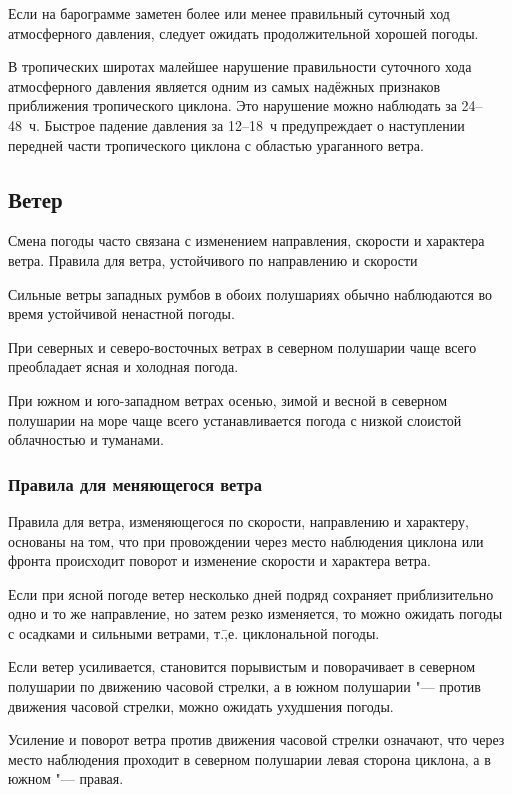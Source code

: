  Если на барограмме заметен более или менее правильный суточный
ход атмосферного давления, следует ожидать продолжительной хорошей
погоды.

 В тропических широтах малейшее нарушение правильности
суточного хода атмосферного давления является одним из самых надёжных
признаков приближения тропического циклона. Это нарушение можно
наблюдать за 24--48~ч. Быстрое падение давления за 12--18~ч
предупреждает о наступлении передней части тропического циклона с
областью ураганного ветра.

\subsection{Ветер}

Смена погоды часто связана с изменением направления, скорости и
характера ветра.  Правила для ветра, устойчивого по направлению и
скорости

 Сильные ветры западных румбов в обоих полушариях обычно
наблюдаются во время устойчивой ненастной погоды.

 При северных и северо-восточных ветрах в северном полушарии
чаще всего преобладает ясная и холодная погода.

 При южном и юго-западном ветрах осенью, зимой и весной в северном
полушарии на море чаще всего устанавливается погода с низкой слоистой
облачностью и туманами.

\subsubsection{Правила для меняющегося ветра}

Правила для ветра, изменяющегося по скорости, направлению и характеру,
основаны на том, что при провождении через место наблюдения циклона
или фронта происходит поворот и изменение скорости и характера ветра.

 Если при ясной погоде ветер несколько дней подряд сохраняет
приблизительно одно и то же направление, но затем резко изменяется, то
можно ожидать погоды с осадками и сильными ветрами,
т.\=,е. циклональной погоды.

 Если ветер усиливается, становится порывистым и поворачивает в
северном полушарии по движению часовой стрелки, а в южном полушарии
"--- против движения часовой стрелки, можно ожидать ухудшения погоды.

 Усиление и поворот ветра против движения часовой стрелки
означают, что через место наблюдения проходит в северном полушарии
левая сторона циклона, а в южном "--- правая.

